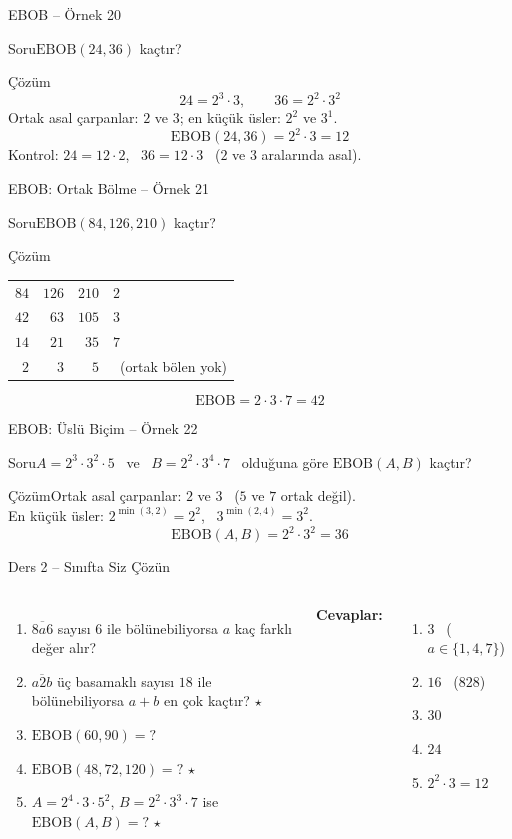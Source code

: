 \documentclass[aspectratio=169,11pt,handout]{beamer}
\newcommand{\soru}[3]{%
\begin{frame}{#1}
  \begin{block}{Soru}\large #2\end{block}
  \pause
  \begin{exampleblock}{Çözüm}\large #3\end{exampleblock}
\end{frame}}
\newcommand{\ab}[1]{\overline{#1}}
\begin{document}
\soru{EBOB -- Örnek 20}
{\(\text{EBOB}(24,36)\) kaçtır?}
{\[24=2^3\cdot 3,\qquad 36=2^2\cdot 3^2\]
Ortak asal çarpanlar: \(2\) ve \(3\); en küçük üsler: \(2^2\) ve \(3^1\).
\[\text{EBOB}(24,36)=2^2\cdot 3=12\]
Kontrol: \(24=12\cdot 2\), \ \(36=12\cdot 3\) \ (\(2\) ve \(3\) aralarında asal).}

\soru{EBOB: Ortak Bölme -- Örnek 21}
{\(\text{EBOB}(84,126,210)\) kaçtır?}
{{\normalsize
\begin{tabular}{rrr|l}
\(84\) & \(126\) & \(210\) & \(2\)\\
\(42\) & \(63\) & \(105\) & \(3\)\\
\(14\) & \(21\) & \(35\) & \(7\)\\
\(2\) & \(3\) & \(5\) & \ (ortak bölen yok)
\end{tabular}}
\[\text{EBOB}=2\cdot 3\cdot 7=42\]}

\soru{EBOB: Üslü Biçim -- Örnek 22}
{\(A=2^3\cdot 3^2\cdot 5\) \ ve \ \(B=2^2\cdot 3^4\cdot 7\) \ olduğuna göre \(\text{EBOB}(A,B)\) kaçtır?}
{Ortak asal çarpanlar: \(2\) ve \(3\) \ (\(5\) ve \(7\) ortak değil).\\[3pt]
En küçük üsler: \(2^{\min(3,2)}=2^2\), \ \(3^{\min(2,4)}=3^2\).
\[\text{EBOB}(A,B)=2^2\cdot 3^2=36\]}

\begin{frame}{Ders 2 -- Sınıfta Siz Çözün}
\begin{columns}[t]
\begin{enumerate}
\item \(\ab{8a6}\) sayısı \(6\) ile bölünebiliyorsa \(a\) kaç farklı değer alır?
\item \(\ab{a2b}\) üç basamaklı sayısı \(18\) ile bölünebiliyorsa \(a+b\) en çok kaçtır? \(\star\)
\item \(\text{EBOB}(60,90)=?\)
\item \(\text{EBOB}(48,72,120)=?\) \(\star\)
\item \(A=2^4\cdot 3\cdot 5^2\), \(B=2^2\cdot 3^3\cdot 7\) ise \(\text{EBOB}(A,B)=?\) \(\star\)
\end{enumerate}
\pause
\textbf{Cevaplar:}
\begin{enumerate}
\item \(3\) \ (\(a\in\{1,4,7\}\))
\item \(16\) \ (\(828\))
\item \(30\)
\item \(24\)
\item \(2^2\cdot 3=12\)
\end{enumerate}
\end{columns}
\vspace{4pt}{\footnotesize \(\star\) işaretli soruların adım adım çözümü sonraki slaytlardadır.}
\end{frame}
\end{document}
